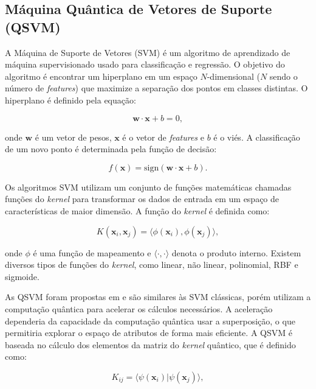 \subsection{Máquina Quântica de Vetores de Suporte (QSVM)} \label{QSVM}

A Máquina de Suporte de Vetores (SVM) é um algoritmo de aprendizado de máquina supervisionado usado para classificação e regressão. O objetivo do algoritmo é encontrar um hiperplano em um espaço $N$-dimensional ($N$ sendo o número de \textit{features}) que maximize a separação dos pontos em classes distintas. O hiperplano é definido pela equação:

\begin{equation}
\mathbf{w} \cdot \mathbf{x} + b = 0,
\end{equation}

\noindent onde $\mathbf{w}$ é um vetor de pesos, $\mathbf{x}$ é o vetor de \textit{features} e $b$ é o viés. A classificação de um novo ponto é determinada pela função de decisão:

\begin{equation}
f(\mathbf{x}) = \text{sign}(\mathbf{w} \cdot \mathbf{x} + b).
\end{equation}

Os algoritmos SVM utilizam um conjunto de funções matemáticas chamadas funções do \textit{kernel} para transformar os dados de entrada em um espaço de características de maior dimensão. A função do \textit{kernel} é definida como:

\begin{equation}
K(\mathbf{x}_i, \mathbf{x}_j) = \langle \phi(\mathbf{x}_i), \phi(\mathbf{x}_j) \rangle,
\end{equation}

\noindent onde $\phi$ é uma função de mapeamento e $\langle \cdot, \cdot \rangle$ denota o produto interno. Existem diversos tipos de funções do \textit{kernel}, como linear, não linear, polinomial, RBF e sigmoide.

As QSVM foram propostas em  e são similares às SVM clássicas, porém utilizam a computação quântica para acelerar os cálculos necessários. A aceleração dependeria da capacidade da computação quântica usar a superposição, o que permitiria explorar o espaço de atributos de forma mais eficiente. A QSVM é baseada no cálculo dos elementos da matriz do \textit{kernel} quântico, que é definido como:

\begin{equation}
K_{ij} = \langle \psi(\mathbf{x}_i) | \psi(\mathbf{x}_j) \rangle,
\end{equation}

